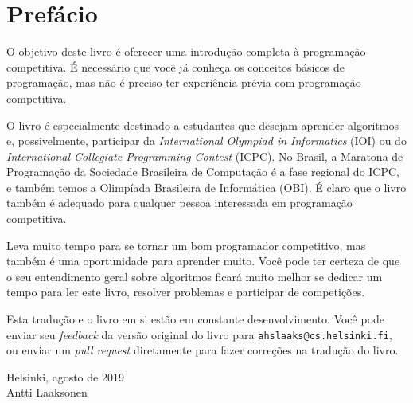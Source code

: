 \chapter*{Prefácio}

O objetivo deste livro é oferecer uma introdução completa à programação competitiva. É necessário que você já conheça os conceitos básicos de programação, mas não é preciso ter experiência prévia com programação competitiva.

O livro é especialmente destinado a estudantes que desejam aprender algoritmos e, possivelmente, participar da \emph{International Olympiad in Informatics} (IOI) ou do \emph{International Collegiate Programming Contest} (ICPC). No Brasil, a Maratona de Programação da Sociedade Brasileira de Computação é a fase regional do ICPC, e também temos a Olimpíada Brasileira de Informática (OBI). É claro que o livro também é adequado para qualquer pessoa interessada em programação competitiva.

Leva muito tempo para se tornar um bom programador competitivo, mas também é uma oportunidade para aprender muito. Você pode ter certeza de que o seu entendimento geral sobre algoritmos ficará muito melhor se dedicar um tempo para ler este livro, resolver problemas e participar de competições.

Esta tradução e o livro em si estão em constante desenvolvimento. Você pode enviar seu \emph{feedback} da versão original do livro para
\texttt{ahslaaks@cs.helsinki.fi}, ou enviar um \emph{pull request} diretamente para fazer correções na tradução do livro.

\begin{flushright}
Helsinki, agosto de 2019 \\
Antti Laaksonen
\end{flushright}
